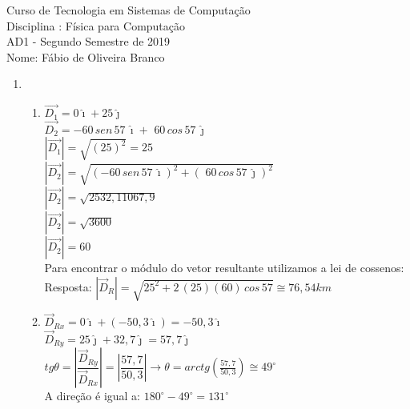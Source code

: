 \documentclass[a4paper, 12pt]{article}
\begin{document}
\begin{center}
Curso de Tecnologia em Sistemas de Computação \\
Disciplina : Física para Computação \\
AD1 - Segundo Semestre de 2019 \\
Nome: Fábio de Oliveira Branco\\ 
\end{center} 


\begin{enumerate}
\item \begin{enumerate}
	\item 
	 $\vec{D_1} = 0\hat{\imath} + 25\hat{\jmath}$ \\
	
	$\vec{D_2} = -60 \, sen\,57\,\hat{\imath} + \,\,60 \, cos\,57\,\hat{\jmath}$ \\
	
	$|\vec{D_1}| = \sqrt{(25)^2} = 25$ \\
	
	$|\vec{D_2}| = \sqrt{(-60 \, sen\,57\,\hat{\imath})^2 + ( \,\,60 \, cos\,57\,\hat{\jmath})^2}$ \\
	
	$|\vec{D_2}| = \sqrt{2532,1 1067,9}$ \\
	
	$|\vec{D_2}| = \sqrt{3600}$ \\
	
	$|\vec{D_2}| = 60$ \\
	
	Para encontrar o módulo do vetor resultante utilizamos a lei de cossenos: \\ 
	
	 Resposta: $|\vec{D}_R| = \sqrt{25^2 + 2\,(25)(60)\, cos\,57} \cong 76,54km$\\
	
	\item $\vec{D}_{Rx} = 0 \hat{\imath} + (-50,3 \hat{\imath}) = -50,3 \hat{\imath}$ \\
	
	$\vec{D}_{Ry} = 25\hat{\jmath} + 32,7\hat{\jmath} = 57,7\hat{\jmath} $ \\
	
	$tg\theta = |\dfrac{\vec{D}_{Ry}}{\vec{D}_{Rx}}| = |\dfrac{57,7}{50,3}| \rightarrow \theta = arctg(\frac{57,7}{50,3}) \cong 49^{\circ}$ \\
	
A direção é igual a: $180^{\circ} - 49^{\circ} =  131^{\circ}$
\end{enumerate}


\end{enumerate}
\end{document}
